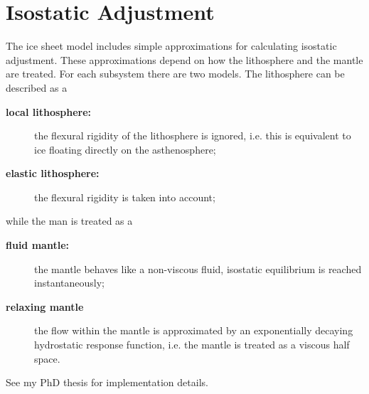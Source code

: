 \section{Isostatic Adjustment}
The ice sheet model includes simple approximations for calculating isostatic adjustment. These approximations depend on how the lithosphere and the mantle are treated. For each subsystem there are two models. The lithosphere can be described as a
\begin{description}
\item[\textbf{local lithosphere:}] the flexural rigidity of the lithosphere is ignored, i.e. this is equivalent to ice floating directly on the asthenosphere;
\item[\textbf{elastic lithosphere:}] the flexural rigidity is taken into account;
\end{description}
while the man is treated as a
\begin{description}
\item [\textbf{fluid mantle:}] the mantle behaves like a non-viscous fluid, isostatic equilibrium is reached instantaneously;
\item [\textbf{relaxing mantle}] the flow within the mantle is approximated by an exponentially decaying hydrostatic response function, i.e. the mantle is treated as a viscous half space.
\end{description}
See my PhD thesis for implementation details.